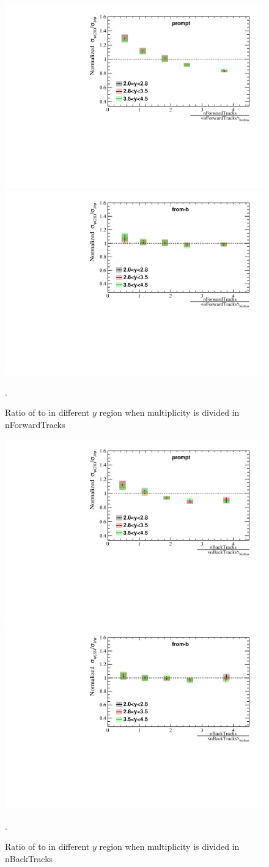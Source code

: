 \begin{figure}[H]
  \begin{center}
    \includegraphics[width=0.48\linewidth]{pdf/Result/promptRatioYF.pdf}
    \includegraphics[width=0.48\linewidth]{pdf/Result/frombRatioYF.pdf}
  \end{center}
  \caption{Ratio of \psitwos to \jpsi in different $y$ region when multiplicity is divided in nForwardTracks}.
  \label{RatioY_For}
\end{figure}

\begin{figure}[H]
  \begin{center}
    \includegraphics[width=0.48\linewidth]{pdf/Result/promptRatioYB.pdf}
    \includegraphics[width=0.48\linewidth]{pdf/Result/frombRatioYB.pdf}
  \end{center}
  \caption{Ratio of \psitwos to \jpsi in different $y$ region when multiplicity is divided in nBackTracks}.
  \label{RatioY_Back}
\end{figure}
